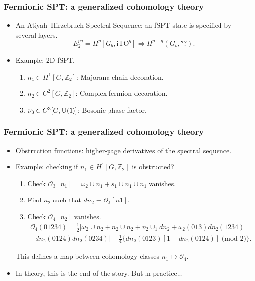\documentclass[xcolor=table, aspectratio=43,ignorenonframetext]{beamer}
\newcommand{\uone}{\text U(1)}
\begin{document}
\begin{frame}
	\frametitle{Fermionic SPT: a generalized cohomology theory}
	\begin{itemize}
		\item An Atiyah–Hirzebruch Spectral Sequence: an fSPT state is specified by several layers.
		\[E^{pq}_2=H^p[G_b, \text{iTO}^q]\Rightarrow H^{p+q}(G_b, ??).\]
		\item Example: 2D fSPT,
		\begin{enumerate}
			\item $n_1\in H^1[G, \mathbb Z_2]$: Majorana-chain decoration.
			\item $n_2\in C^2[G, \mathbb Z_2]$: Complex-fermion decoration.
			\item $\nu_3\in C^3[G, \uone]$: Bosonic phase factor.
		\end{enumerate}
	\end{itemize}
\end{frame}

\begin{frame}
	\frametitle{Fermionic SPT: a generalized cohomology theory}
	\begin{itemize}
		\item Obstruction functions: higher-page derivatives of the spectral sequence.
		\item Example: checking if $n_1\in H^1[G, \mathbb Z_2]$ is obstructed?
		\begin{enumerate}
			\item Check $\mathcal O_3[n_1] = \omega_2\cup n_1 + s_1\cup n_1\cup n_1$ vanishes.
			\item Find $n_2$ such that $dn_2 = \mathcal O_3[n1]$.
			\item Check $\mathcal O_4[n_2]$ vanishes.
			\begin{align*}\mathcal O_4(01234) = \frac12\big[\omega_2\cup n_2 + n_2\cup n_2 + n_2 \cup_1 dn_2 + \omega_2(013)dn_2(1234)\\ + dn_2(0124)dn_2(0234)\big]
			-\frac14\big\{dn_2(0123)[1-dn_2(0124)]\text{ (mod 2)}\big\}.
		\end{align*}
		\end{enumerate}
		This defines a map between cohomology classes
		$n_1\mapsto \mathcal O_4$.
		\item In theory, this is the end of the story. But in practice...
	\end{itemize}
\end{frame}
\end{document}
